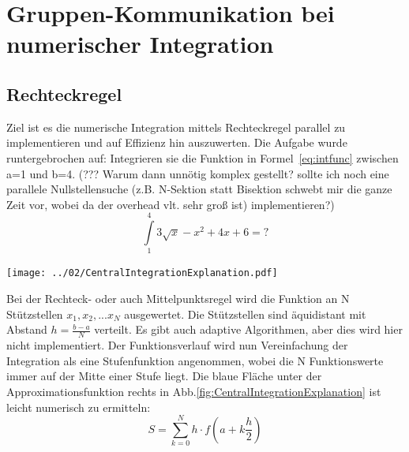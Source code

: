 \documentclass[12pt,a4paper]{article}
\begin{document}
\newpage


\section{Gruppen-Kommunikation bei numerischer Integration}

\subsection{Rechteckregel}

Ziel ist es die numerische Integration mittels Rechteckregel parallel zu implementieren und auf Effizienz hin auszuwerten. Die Aufgabe wurde runtergebrochen auf: Integrieren sie die Funktion in Formel~\ref{eq:intfunc} zwischen a=1 und b=4. (??? Warum dann unnötig komplex gestellt? sollte ich noch eine parallele Nullstellensuche (z.B. N-Sektion statt Bisektion schwebt mir die ganze Zeit vor, wobei da der overhead vlt. sehr groß ist) implementieren?)\\
\begin{equation}
	\label{eq:intfunc}
	\int\limits_1^4 3\sqrt{x}-x^2+4x+6 = \text{?}
\end{equation}

\begin{center}
	\centering
	\captionsetup{type=figure}
	\begin{minipage}{\linewidth}
		\texttt{[image: ../02/CentralIntegrationExplanation.pdf]}
	\end{minipage}
	\label{fig:CentralIntegrationExplanation}
\end{center}

Bei der Rechteck- oder auch Mittelpunktsregel wird die Funktion an N Stützstellen $x_1,x_2,...x_N$ ausgewertet. Die Stützstellen sind äquidistant mit Abstand $h=\frac{b-a}{N}$ verteilt. Es gibt auch adaptive Algorithmen, aber dies wird hier nicht implementiert.
Der Funktionsverlauf wird nun Vereinfachung der Integration als eine Stufenfunktion angenommen, wobei die N Funktionswerte immer auf der Mitte einer Stufe liegt. Die blaue Fläche unter der Approximationsfunktion rechts in Abb.\ref{fig:CentralIntegrationExplanation} ist leicht numerisch zu ermitteln:
\begin{equation}
	\label{eq:centralint}
	S = \sum\limits_{k=0}^{N} h\cdot f\left(a+k\frac{h}{2}\right)
\end{equation}
\end{document}
